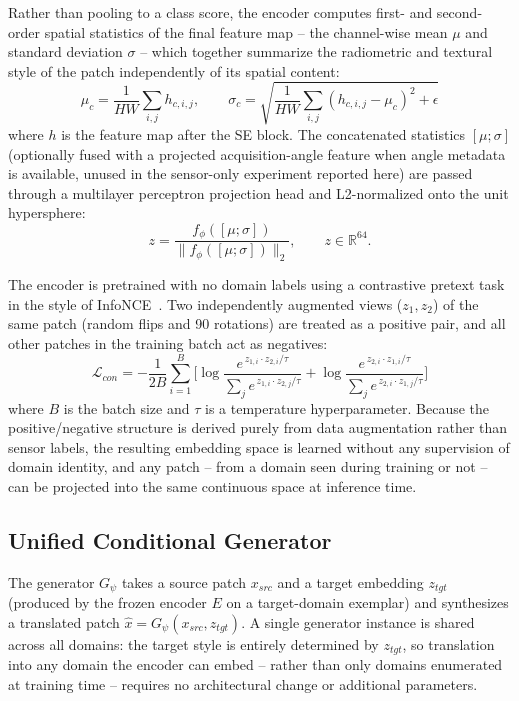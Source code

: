 \documentclass[runningheads]{llncs}
\begin{document}
Rather than pooling to a class score, the encoder computes first- and second-order spatial statistics of the final feature map -- the channel-wise mean $\mu$ and standard deviation $\sigma$ -- which together summarize the radiometric and textural style of the patch independently of its spatial content:
\begin{equation}
\mu_c = \frac{1}{HW}\sum_{i,j} h_{c,i,j}, \qquad
\sigma_c = \sqrt{\frac{1}{HW}\sum_{i,j}(h_{c,i,j}-\mu_c)^2 + \epsilon}
\label{eq:stats}
\end{equation}
where $h$ is the feature map after the SE block. The concatenated statistics $[\mu;\sigma]$ (optionally fused with a projected acquisition-angle feature when angle metadata is available, unused in the sensor-only experiment reported here) are passed through a multilayer perceptron projection head and L2-normalized onto the unit hypersphere:
\begin{equation}
z = \frac{f_\phi([\mu;\sigma])}{\lVert f_\phi([\mu;\sigma]) \rVert_2}, \qquad z \in \mathbb{R}^{64}.
\label{eq:embed}
\end{equation}

The encoder is pretrained with no domain labels using a contrastive pretext task in the style of InfoNCE~\cite{oord2018cpc}. Two independently augmented views ($z_1, z_2$) of the same patch (random flips and 90\textdegree{} rotations) are treated as a positive pair, and all other patches in the training batch act as negatives:
\begin{equation}
\mathcal{L}_{con} = -\frac{1}{2B}\sum_{i=1}^{B}\Big[
\log\frac{e^{\,z_{1,i}\cdot z_{2,i}/\tau}}{\sum_{j} e^{\,z_{1,i}\cdot z_{2,j}/\tau}}
+
\log\frac{e^{\,z_{2,i}\cdot z_{1,i}/\tau}}{\sum_{j} e^{\,z_{2,i}\cdot z_{1,j}/\tau}}
\Big]
\label{eq:infonce}
\end{equation}
where $B$ is the batch size and $\tau$ is a temperature hyperparameter. Because the positive/negative structure is derived purely from data augmentation rather than sensor labels, the resulting embedding space is learned without any supervision of domain identity, and any patch -- from a domain seen during training or not -- can be projected into the same continuous space at inference time.

\subsection{Unified Conditional Generator}
\label{sec:generator}
The generator $G_\psi$ takes a source patch $x_{src}$ and a target embedding $z_{tgt}$ (produced by the frozen encoder $E$ on a target-domain exemplar) and synthesizes a translated patch $\hat{x} = G_\psi(x_{src}, z_{tgt})$. A single generator instance is shared across all domains: the target style is entirely determined by $z_{tgt}$, so translation into any domain the encoder can embed -- rather than only domains enumerated at training time -- requires no architectural change or additional parameters.
\end{document}
